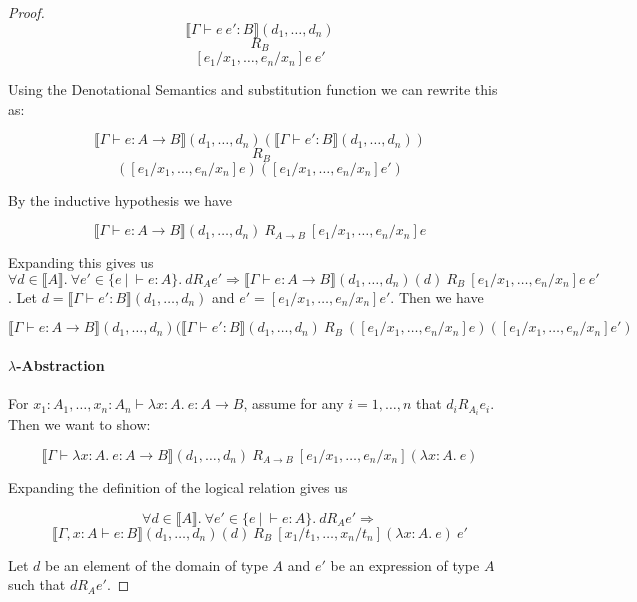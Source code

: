 \begin{proof}
\[ \llbracket \Gamma \vdash  e \ e' : B \rrbracket (d_1, \dots, d_n) \]
\[ R_B \]
\[ [e_1/x_1, \dots, e_n/x_n]e \ e' \]

Using the Denotational Semantics and substitution function we can rewrite this as:

\[ \llbracket \Gamma \vdash  e : A \to B \rrbracket (d_1, \dots, d_n) (\llbracket \Gamma \vdash e' : B \rrbracket (d_1, \dots, d_n))\]
\[ \ R_B \]
\[ ([e_1/x_1, \dots, e_n/x_n]e) ([e_1/x_1, \dots, e_n/x_n] e') \]

By the inductive hypothesis we have

\[\llbracket \Gamma \vdash  e : A \to B \rrbracket (d_1, \dots, d_n) \ R_{A \to B} \ [e_1/x_1, \dots, e_n/x_n]e\]


Expanding this gives us $ \forall d \in \llbracket A \rrbracket. \ \forall e' \in \{ e \ | \ \vdash e : A\}. \ d R_A e' \Rightarrow \llbracket \Gamma \vdash  e : A \to B \rrbracket (d_1, \dots, d_n) (d) \  R_B \ [e_1/x_1, \dots, e_n/x_n]e \ e'$. Let $d = \llbracket \Gamma \vdash e' : B \rrbracket (d_1, \dots, d_n)$ and $e' = [e_1/x_1, \dots, e_n/x_n]e'$. Then we have 

\[\llbracket \Gamma \vdash  e : A \to B \rrbracket (d_1, \dots, d_n) (\llbracket \Gamma \vdash e' : B \rrbracket (d_1, \dots, d_n) \ R_B \ ([e_1/x_1, \dots, e_n/x_n]e) ([e_1/x_1, \dots, e_n/x_n] e')\]

\paragraph{$\lambda$-Abstraction} 
For $x_1 : A_1, \dots, x_n : A_n \vdash \lambda x : A. \ e : A \to B$, assume for any $i = 1, \dots, n$ that $d_i R_{A_i} e_i$. Then we want to show:

\[ \llbracket \Gamma \vdash \lambda x : A. \ e : A \to B \rrbracket (d_1, \dots, d_n) \ R_{A \to B} \ [e_1/x_1, \dots, e_n/x_n] (\lambda x : A. \ e) \]



Expanding the definition of the logical relation gives us

\[ \forall d \in \llbracket A \rrbracket. \ \forall e' \in \{ e \ | \ \vdash e : A\}. \ d R_A e' \Rightarrow\]
\[ \llbracket \Gamma ,x:A \vdash e : B \rrbracket(d_1, \dots, d_n) (d) \ R_B \  [x_1/t_1, \dots, x_n/t_n](\lambda x:A. \ e) \ e'\]

Let $d$ be an element of the domain of type $A$ and $e'$ be an expression of type $A$ such that $d R_A  e'$.


\end{proof}
